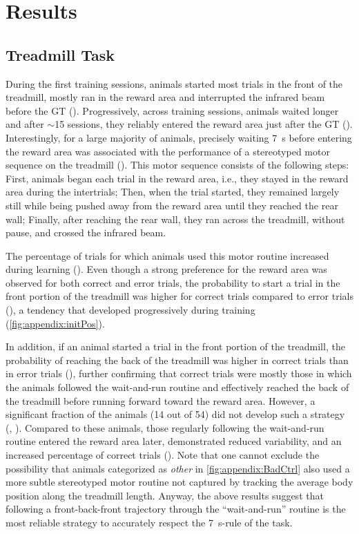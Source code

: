 \section{Results}
\label{ch:time:results}

\subsection{Treadmill Task}
\label{ch:time:treadmill}
During the first training sessions, animals started most trials in the front of the treadmill, mostly ran in the reward area and interrupted the infrared beam before the GT ().
Progressively, across training sessions, animals waited longer and after $\sim$15 sessions, they reliably entered the reward area just after the GT ().
Interestingly, for a large majority of animals, precisely waiting 7~s before entering the reward area was associated with the performance of a stereotyped motor sequence on the treadmill ().
This motor sequence consists of the following steps:
    First, animals began each trial in the reward area, i.e., they stayed in the reward area during the intertrials;
    Then, when the trial started, they remained largely still while being pushed away from the reward area until they reached the rear wall;
    Finally, after reaching the rear wall, they ran across the treadmill, without pause, and crossed the infrared beam.

The percentage of trials for which animals used this motor routine increased during learning ().
Even though a strong preference for the reward area was observed for both correct and error trials, the probability to start a trial in the front portion of the treadmill was higher for correct trials compared to error trials (), a tendency that developed progressively during training (\autoref{fig:appendix:initPos}).
\par
In addition, if an animal started a trial in the front portion of the treadmill, the probability of reaching the back of the treadmill was higher in correct trials than in error trials (), further confirming that correct trials were mostly those in which the animals followed the wait-and-run routine and effectively reached the back of the treadmill before running forward toward the reward area.
However, a significant fraction of the animals (14 out of 54) did not develop such a strategy (, ).
Compared to these animals, those regularly following the wait-and-run routine entered the reward area later, demonstrated reduced variability, and an increased percentage of correct trials ().
Note that one cannot exclude the possibility that animals categorized as \textit{other} in \autoref{fig:appendix:BadCtrl} also used a more subtle stereotyped motor routine not captured by tracking the average body position along the treadmill length.
Anyway, the above results suggest that following a front-back-front trajectory through the ``wait-and-run'' routine is the most reliable strategy to accurately respect the 7~s-rule of the task.


